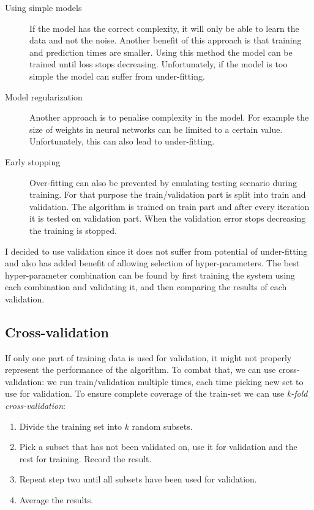 \documentclass[12pt,a4paper]{book}
\begin{document}
\begin{description}
\item[Using simple models]
If the model has the correct complexity, it will only be able to learn the data and not the noise.
Another benefit of this approach is that training and prediction times are smaller.
Using this method the model can be trained until loss stops decreasing.
Unfortunately, if the model is too simple the model can suffer from under-fitting.

\item[Model regularization]
Another approach is to penalise complexity in the model.
For example the size of weights in neural networks can be limited to a certain value.
Unfortunately, this can also lead to under-fitting.

\item[Early stopping] 
Over-fitting can also be prevented by emulating testing scenario during training.
For that purpose the train/validation part is split into train and validation.
The algorithm is trained on train part and after every iteration it is tested on validation part.
When the validation error stops decreasing the training is stopped.
\end{description}
I decided to use validation since it does not suffer from potential of under-fitting and also has added benefit of allowing selection of hyper-parameters.
The best hyper-parameter combination can be found by first training the system using each combination and validating it, and then comparing the results of each validation.

\subsection{Cross-validation}
If only one part of training data is used for validation, it might not properly represent the performance of the algorithm.
To combat that, we can use cross-validation: we run train/validation multiple times, each time picking new set to use for validation.
To ensure complete coverage of the train-set we can use \emph{k-fold cross-validation}: 
\begin{enumerate}
\item Divide the training set into $k$ random subsets.
\item Pick a subset that has not been validated on, use it for validation and the rest for training.
Record the result.
\item Repeat step two until all subsets have been used for validation.
\item Average the results.
\end{enumerate}
\end{document}
